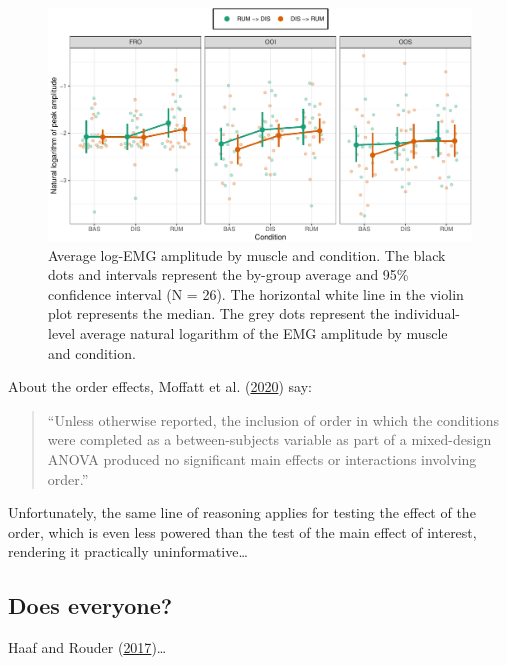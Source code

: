 \documentclass[
  english,
  man,floatsintext]{apa6}
\begin{document}
\begin{figure}[!htb]

{\centering \includegraphics[width=1\linewidth]{manuscript_files/figure-latex/order-1} 

}

\caption{Average log-EMG amplitude by muscle and condition. The black dots and intervals represent the by-group average and 95\% confidence interval (N = 26). The horizontal white line in the violin plot represents the median. The grey dots represent the individual-level average natural logarithm of the EMG amplitude by muscle and condition.}\label{fig:order}
\end{figure}

About the order effects, Moffatt et al. (\protect\hyperlink{ref-moffatt_inner_2020}{2020}) say:

\begin{quote}
``Unless otherwise reported, the inclusion of order in which the conditions were completed as a between-subjects variable as part of a mixed-design ANOVA produced no significant main effects or interactions involving order.''
\end{quote}

Unfortunately, the same line of reasoning applies for testing the effect of the order, which is even less powered than the test of the main effect of interest, rendering it practically uninformative\ldots{}

\hypertarget{does-everyone}{%
\subsection{Does everyone?}\label{does-everyone}}

Haaf and Rouder (\protect\hyperlink{ref-haaf_developing_2017}{2017})\ldots{}
\end{document}
